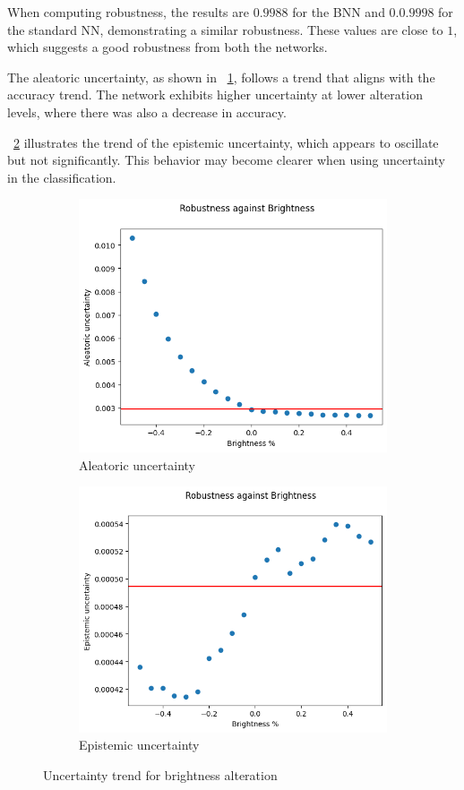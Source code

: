 When computing robustness, the results are $0.9988$ for the BNN and $0.0.9998$ for the standard NN, demonstrating a similar robustness. These values are close to $1$, which suggests a good robustness from both the networks.

The aleatoric uncertainty, as shown in \Fig~\ref{fig:br_aleatoric}, follows a trend that aligns with the accuracy trend. The network exhibits higher uncertainty at lower alteration levels, where there was also a decrease in accuracy. 

\Fig~\ref{fig:br_epistemic} illustrates the trend of the epistemic uncertainty, which appears to oscillate but not significantly. This behavior may become clearer when using uncertainty in the classification.

\begin{figure}[h]
	\centering
	\begin{subfigure}{.5\textwidth}
		\centering
		\includegraphics[width=0.8\linewidth]{ImageFiles/EvalBNN/BR/aleatoric}
		\caption{Aleatoric uncertainty}
		\label{fig:br_aleatoric}
	\end{subfigure}%
	\begin{subfigure}{.5\textwidth}
		\centering
		\includegraphics[width=0.8\linewidth]{ImageFiles/EvalBNN/BR/epistemic}
		\caption{Epistemic uncertainty}
		\label{fig:br_epistemic}
	\end{subfigure}
	\caption{Uncertainty trend for brightness alteration}
	\label{fig:br_uncertainty}
\end{figure}

